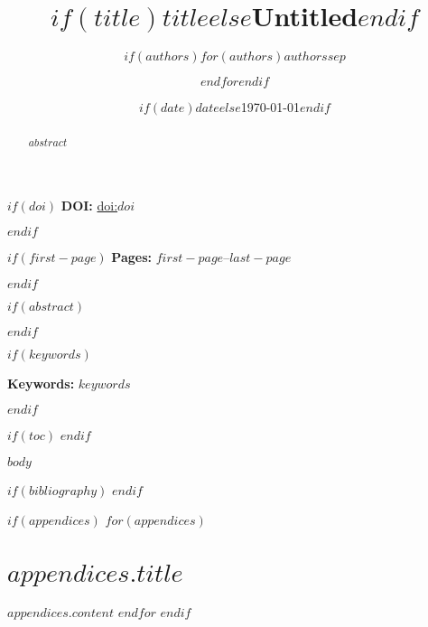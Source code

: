 \documentclass[12pt,a4paper]{article}
\title{$if(title)$$title$$else$Untitled$endif$}
\author{$if(authors)$$for(authors)$$authors$$sep$ \and $endfor$$endif$}
\date{$if(date)$$date$$else$\today$endif$}
\newcommand{\doi}[1]{\href{https://doi.org/#1}{doi:#1}}
\theoremstyle{plain}
\theoremstyle{definition}
\theoremstyle{remark}
\newcommand{\keywords}[1]{\par\noindent\textbf{Keywords:} #1}
\begin{document}
\maketitle

$if(doi)$
\noindent\textbf{DOI:} \doi{$doi$}
\par\vspace{0.5em}
$endif$

$if(first-page)$
\noindent\textbf{Pages:} $first-page$--$last-page$
\par\vspace{1em}
$endif$

$if(abstract)$
\begin{abstract}
$abstract$
\end{abstract}
$endif$

$if(keywords)$
\keywords{$keywords$}
\par\vspace{1em}
$endif$

$if(toc)$
\tableofcontents
\newpage
$endif$

$body$

$if(bibliography)$
\newpage
\printbibliography[title={$if(references-title)$$references-title$$else$References$endif$}]
$endif$

$if(appendices)$
\newpage
\appendix
$for(appendices)$
\section{$appendices.title$}
$appendices.content$
$endfor$
$endif$
\end{document}
